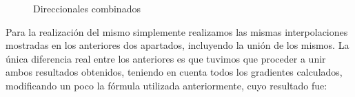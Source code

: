 \documentclass[10pt, a4paper]{article}
\begin{document}
\begin{figure}[H]
\centering
	\caption{Direccionales combinados} 
\end{figure}

Para la realizaci\'on del mismo simplemente realizamos las mismas interpolaciones mostradas en los anteriores dos apartados, incluyendo la uni\'on de los mismos. La \'unica diferencia real entre los anteriores es que tuvimos que proceder a unir ambos resultados obtenidos, teniendo en cuenta todos los gradientes calculados, modificando un poco la f\'ormula utilizada anteriormente, cuyo resultado fue:
\end{document}
